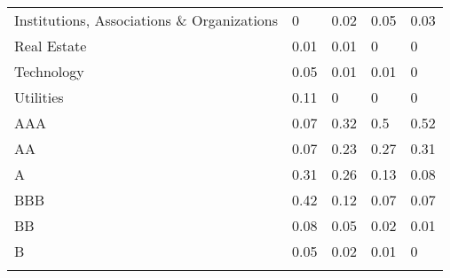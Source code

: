 \begin{table}[h!]
\begin{tabular}{lllll}
\cellcolor[HTML]{FFFFFF}Institutions,   Associations \& Organizations & \cellcolor[HTML]{FCFCFF}0 & \cellcolor[HTML]{F9FBFC}0.02 & \cellcolor[HTML]{F4F9F8}0.05 & \cellcolor[HTML]{F7FAFB}0.03 \\
\cellcolor[HTML]{FFFFFF}Real Estate & \cellcolor[HTML]{FBFCFE}0.01 & \cellcolor[HTML]{FBFCFE}0.01 & \cellcolor[HTML]{FCFCFF}0 & \cellcolor[HTML]{FCFCFF}0 \\
\cellcolor[HTML]{FFFFFF}Technology & \cellcolor[HTML]{F4F9F8}0.05 & \cellcolor[HTML]{FBFCFE}0.01 & \cellcolor[HTML]{FBFCFE}0.01 & \cellcolor[HTML]{FCFCFF}0 \\
\rowcolor[HTML]{FCFCFF} 
\cellcolor[HTML]{FFFFFF}Utilities & \cellcolor[HTML]{E9F5EF}0.11 & 0 & 0 & 0 \\
\cellcolor[HTML]{FFFFFF}AAA & \cellcolor[HTML]{F0F8F5}0.07 & \cellcolor[HTML]{C4E6CF}0.32 & \cellcolor[HTML]{A5D9B4}0.5 & \cellcolor[HTML]{A1D7B1}0.52 \\
\cellcolor[HTML]{FFFFFF}AA & \cellcolor[HTML]{F0F8F5}0.07 & \cellcolor[HTML]{D4ECDD}0.23 & \cellcolor[HTML]{CDE9D7}0.27 & \cellcolor[HTML]{C6E6D0}0.31 \\
\cellcolor[HTML]{FFFFFF}A & \cellcolor[HTML]{C6E6D0}0.31 & \cellcolor[HTML]{CFEAD8}0.26 & \cellcolor[HTML]{E6F3EC}0.13 & \cellcolor[HTML]{EEF7F3}0.08 \\
\cellcolor[HTML]{FFFFFF}BBB & \cellcolor[HTML]{B3DFC0}0.42 & \cellcolor[HTML]{E7F4ED}0.12 & \cellcolor[HTML]{F0F8F5}0.07 & \cellcolor[HTML]{F0F8F5}0.07 \\
\cellcolor[HTML]{FFFFFF}BB & \cellcolor[HTML]{EEF7F3}0.08 & \cellcolor[HTML]{F4F9F8}0.05 & \cellcolor[HTML]{F9FBFC}0.02 & \cellcolor[HTML]{FBFCFE}0.01 \\
\cellcolor[HTML]{FFFFFF}B & \cellcolor[HTML]{F4F9F8}0.05 & \cellcolor[HTML]{F9FBFC}0.02 & \cellcolor[HTML]{FBFCFE}0.01 & \cellcolor[HTML]{FCFCFF}0 \\
\hline \\[-1.8ex] 
\end{tabular}
\end{table}

